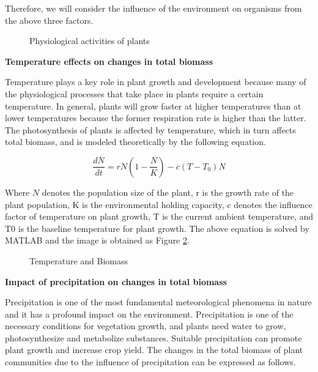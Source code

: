 \documentclass[12pt]{article}
\begin{document}
Therefore, we will consider the influence of the environment on organisms from the above three factors.

\begin{figure}
	\centering
	
	\caption{Physiological activities of plants}
	\label{fig:tree}
\end{figure}

\vspace{0.5cm}

\textbf{Temperature effects on changes in total biomass}

\vspace{0.5cm}

Temperature plays a key role in plant growth and development because many of the physiological processes that take place in plants require a certain temperature. In general, plants will grow faster at higher temperatures than at lower temperatures because the former respiration rate is higher than the latter. The photosynthesis of plants is affected by temperature, which in turn affects total biomass, and is modeled theoretically by the following equation.

\begin{equation}
	\frac{dN}{dt} = rN(1-\frac{N}{K}) - c(T-T_0)N
\end{equation}

Where $N$ denotes the population size of the plant, r is the growth rate of the plant population, K is the environmental holding capacity, c denotes the influence factor of temperature on plant growth, T is the current ambient temperature, and T0 is the baseline temperature for plant growth. The above equation is solved by MATLAB and the image is obtained as Figure \ref{fig:temp}.

\begin{figure}[htb]
	\centering
	
	\caption{Temperature and Biomass}
	\label{fig:temp}
\end{figure}

\vspace{0.5cm}

\textbf{Impact of precipitation on changes in total biomass}

\vspace{0.5cm}

Precipitation is one of the most fundamental meteorological phenomena in nature and it has a profound impact on the environment. Precipitation is one of the necessary conditions for vegetation growth, and plants need water to grow, photosynthesize and metabolize substances. Suitable precipitation can promote plant growth and increase crop yield. The changes in the total biomass of plant communities due to the influence of precipitation can be expressed as follows.
\end{document}

